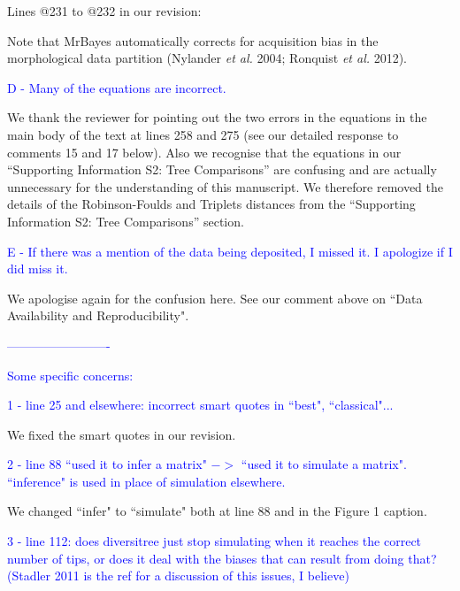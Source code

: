 \documentclass[11pt]{letter}
\begin{document}
\begin{letter}{}
Lines @231 to @232 in our revision:

\hfill\begin{minipage}{\dimexpr\textwidth-1cm}
Note that MrBayes automatically corrects for acquisition bias in the morphological data partition (Nylander \textit{et al.} 2004; Ronquist \textit{et al.} 2012).
\end{minipage}


\textcolor{blue}{D - Many of the equations are incorrect.} %

We thank the reviewer for pointing out the two errors in the equations in the main body of the text at lines 258 and 275 (see our detailed response to comments 15 and 17 below). Also we recognise that the equations in our ``Supporting Information S2: Tree Comparisons'' are confusing and are actually unnecessary for the understanding of this manuscript. We therefore removed the details of the Robinson-Foulds and Triplets distances from the ``Supporting Information S2: Tree Comparisons'' section.


\textcolor{blue}{E - If there was a mention of the data being deposited, I missed it. I apologize if I did miss it.}

We apologise again for the confusion here. See our comment above on ``Data Availability and Reproducibility".


\textcolor{blue}{-------------------------}

\textcolor{blue}{Some specific concerns:}

\textcolor{blue}{1 - line 25 and elsewhere: incorrect smart quotes in ``best", ``classical"...}

We fixed the smart quotes in our revision.


\textcolor{blue}{2 - line 88 ``used it to infer a matrix" $->$ ``used it to simulate a matrix". ``inference" is used in place of simulation elsewhere.}

We changed ``infer" to ``simulate" both at line 88 and in the Figure 1 caption.


\textcolor{blue}{3 - line 112: does diversitree just stop simulating when it reaches the correct number of tips, or does it deal with the biases that can result from doing that? (Stadler 2011 is the ref for a discussion of this issues, I believe)}


\end{letter}
\end{document}
